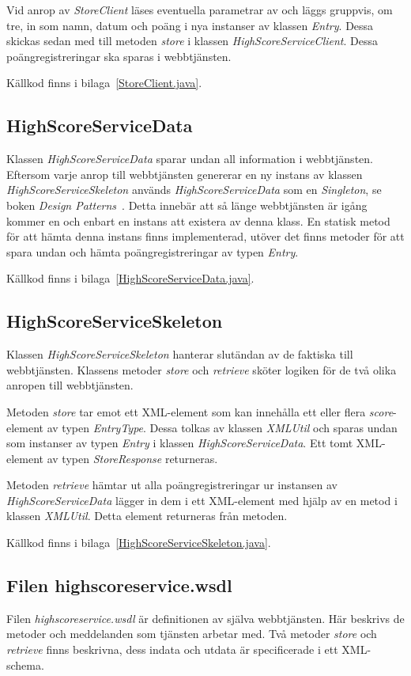\documentclass[a4paper, 12pt]{article}
\begin{document}
Vid anrop av \textit{StoreClient} läses eventuella parametrar av och
läggs gruppvis, om tre, in som namn, datum och poäng i nya instanser av
klassen \textit{Entry}. Dessa skickas sedan med till metoden
\textit{store} i klassen \textit{HighScoreServiceClient}. Dessa
poäng\-registreringar ska sparas i webbtjänsten.

Källkod finns i bilaga~\ref{StoreClient.java}.

\subsection{HighScoreServiceData}
Klassen \textit{HighScoreServiceData} sparar undan all information i
webbtjänsten. Eftersom varje anrop till webbtjänsten genererar en ny
instans av klassen \textit{HighScoreServiceSkeleton} används
\textit{HighScoreServiceData} som en \textit{Singleton}, se boken
\textit{Design Patterns}~\cite{gamma}. Detta innebär att så länge
webbtjänsten är igång kommer en och enbart en instans att existera av
denna klass. En statisk metod för att hämta denna instans finns
implementerad, utöver det finns metoder för att spara undan och hämta
poäng\-registreringar av typen \textit{Entry}.

Källkod finns i bilaga~\ref{HighScoreServiceData.java}.

\subsection{HighScoreServiceSkeleton}
Klassen \textit{HighScoreServiceSkeleton} hanterar slutändan av de
faktiska till webbtjänsten. Klassens metoder \textit{store} och
\textit{retrieve} sköter logiken för de två olika anropen till
webbtjänsten.

Metoden \textit{store} tar emot ett XML-element som kan innehålla ett
eller flera \textit{score}-element av typen \textit{EntryType}. Dessa
tolkas av klassen \textit{XMLUtil} och sparas undan som instanser av
typen \textit{Entry} i klassen \textit{HighScoreServiceData}. Ett tomt
XML-element av typen \textit{StoreResponse} returneras.

Metoden \textit{retrieve} hämtar ut alla poäng\-registreringar ur
instansen av \textit{HighScoreServiceData} lägger in dem i ett
XML-element med hjälp av en metod i klassen \textit{XMLUtil}. Detta
element returneras från metoden.

Källkod finns i bilaga~\ref{HighScoreServiceSkeleton.java}.

\subsection{Filen highscoreservice.wsdl}\label{sec:highscoreservice.wsdl}
Filen \textit{highscoreservice.wsdl} är definitionen av själva
webbtjänsten. Här beskrivs de metoder och meddelanden som tjänsten
arbetar med. Två metoder \textit{store} och \textit{retrieve} finns
beskrivna, dess indata och utdata är specificerade i ett
XML-schema.
\end{document}

